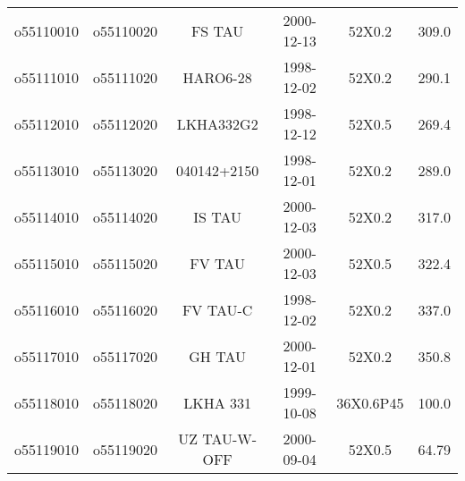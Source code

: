 \begin{table*}
\begin{center}
\begin{tabular}{cccccc}
o55110010& o55110020  & FS TAU & 2000-12-13 & 52X0.2 & 309.0 \\


o55111010& o55111020 & HARO6-28 & 1998-12-02 & 52X0.2 & 290.1 \\


o55112010& o55112020 & LKHA332G2 & 1998-12-12 & 52X0.5 & 269.4 \\


o55113010& o55113020 & 040142+2150 & 1998-12-01 & 52X0.2 & 289.0 \\


o55114010& o55114020 & IS TAU & 2000-12-03 & 52X0.2 & 317.0 \\


o55115010& o55115020 & FV TAU & 2000-12-03 & 52X0.5 & 322.4 \\


o55116010& o55116020 & FV TAU-C & 1998-12-02 & 52X0.2 & 337.0 \\


o55117010& o55117020 & GH TAU & 2000-12-01 & 52X0.2 & 350.8 \\


o55118010& o55118020 & LKHA 331 & 1999-10-08 & 36X0.6P45 & 100.0 \\


o55119010 & o55119020 & UZ TAU-W-OFF & 2000-09-04 & 52X0.5 & 64.79 \\


\end{tabular}
\end{center}
\end{table*}
